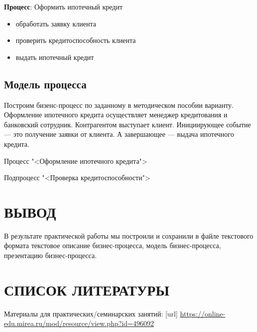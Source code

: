 \textbf{Процесс}: Оформить ипотечный кредит
\begin{itemize}
	\item обработать заявку клиента
	\item проверить кредитоспособность клиента
	\item выдать ипотечный кредит
\end{itemize}

\subsection{Модель процесса}
Построим бизенс-процесс по заданному в методическом пособии варианту.
Оформление ипотечного кредита осуществляет 
менеджер кредитования и банковский сотрудник.
Контрагентом выступает клиент.
Инициирующее событие --- это получение заявки от клиента.
А завершающее --- выдача ипотечного кредита.

\begin{image}
	\caption{Процесс "<Оформление ипотечного кредита">}
\end{image}

\begin{image}
	\caption{Подпроцесс "<Проверка кредитоспособности">}
\end{image}

\clearpage

\section*{ВЫВОД}
В результате практической работы  мы построили и сохранили в
файле текстового формата текстовое описание бизнес-процесса, модель
бизнес-процесса, презентацию бизнес-процесса.

\clearpage

\section*{СПИСОК ЛИТЕРАТУРЫ}
\begin{thebibliography}{}
    \bibitem{}  Материалы для практических/семинарских занятий: [url] 
		\url{https://online-edu.mirea.ru/mod/resource/view.php?id=496092}
\end{thebibliography}
